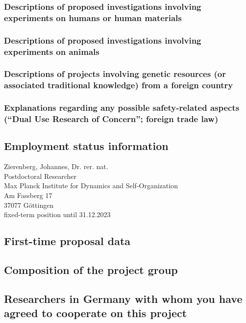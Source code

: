 \documentclass[12pt]{scrartcl}
\begin{document}
\subsubsection{Descriptions of proposed investigations involving experiments on humans or human materials}

\subsubsection{Descriptions of proposed investigations involving experiments on animals}

\subsubsection{Descriptions of projects involving genetic resources (or associated traditional knowledge) from a foreign country}

\subsubsection{Explanations regarding any possible safety-related aspects (``Dual Use Research of Concern''; foreign trade law)}


\subsection{Employment status information}
Zierenberg, Johannes, Dr. rer. nat.\\
Postdoctoral Researcher\\
Max Planck Institute for Dynamics and Self-Organization\\
Am Fassberg 17\\
37077 G\"ottingen\\
fixed-term position until 31.12.2023

\subsection{First-time proposal data}

\subsection{Composition of the project group}

\subsection{Researchers in Germany with whom you have agreed to cooperate on this project}
\end{document}
